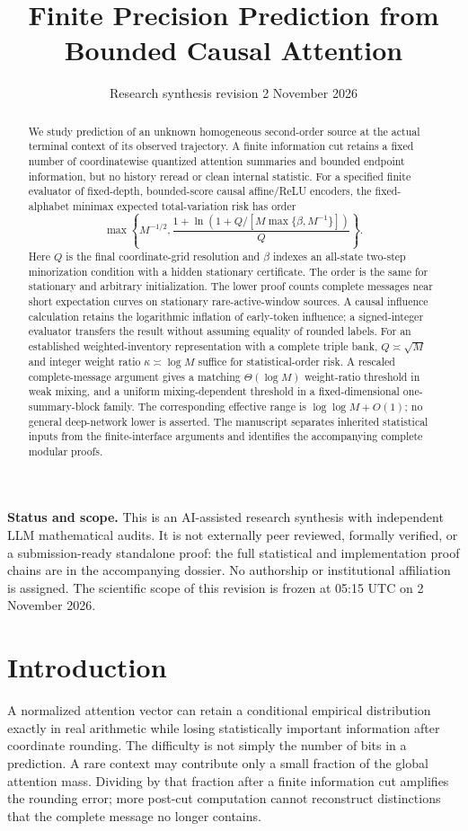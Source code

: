 \documentclass[11pt,letterpaper]{article}
\title{\vspace{-1.4em}Finite Precision Prediction from\\Bounded Causal Attention}
\author{}
\date{Research synthesis revision 2\quad 2 November 2026}
\theoremstyle{definition}\newtheorem{definition}[theorem]{Definition}
\theoremstyle{remark}\newtheorem{remark}[theorem]{Remark}
\begin{document}
\maketitle\vspace{-1.4em}
\begin{abstract}
We study prediction of an unknown homogeneous second-order source at the actual terminal context of its observed trajectory. A finite information cut retains a fixed number of coordinatewise quantized attention summaries and bounded endpoint information, but no history reread or clean internal statistic. For a specified finite evaluator of fixed-depth, bounded-score causal affine/ReLU encoders, the fixed-alphabet minimax expected total-variation risk has order
\[
 \max\left\{M^{-1/2},\frac{1+\ln(1+Q/[M\max\{\beta,M^{-1}\}])}{Q}\right\}.
\]
Here $Q$ is the final coordinate-grid resolution and $\beta$ indexes an all-state two-step minorization condition with a hidden stationary certificate. The order is the same for stationary and arbitrary initialization. The lower proof counts complete messages near short expectation curves on stationary rare-active-window sources. A causal influence calculation retains the logarithmic inflation of early-token influence; a signed-integer evaluator transfers the result without assuming equality of rounded labels. For an established weighted-inventory representation with a complete triple bank, $Q\asymp\sqrt M$ and integer weight ratio $\kappa\asymp\log M$ suffice for statistical-order risk. A rescaled complete-message argument gives a matching $\Theta(\log M)$ weight-ratio threshold in weak mixing, and a uniform mixing-dependent threshold in a fixed-dimensional one-summary-block family. The corresponding effective range is $\log\log M+O(1)$; no general deep-network lower is asserted. The manuscript separates inherited statistical inputs from the finite-interface arguments and identifies the accompanying complete modular proofs.
\end{abstract}
\noindent\textbf{Status and scope.} This is an AI-assisted research synthesis with independent LLM mathematical audits. It is not externally peer reviewed, formally verified, or a submission-ready standalone proof: the full statistical and implementation proof chains are in the accompanying dossier. No authorship or institutional affiliation is assigned. The scientific scope of this revision is frozen at 05:15 UTC on 2 November 2026.

\section{Introduction}
A normalized attention vector can retain a conditional empirical distribution exactly in real arithmetic while losing statistically important information after coordinate rounding. The difficulty is not simply the number of bits in a prediction. A rare context may contribute only a small fraction of the global attention mass. Dividing by that fraction after a finite information cut amplifies the rounding error; more post-cut computation cannot reconstruct distinctions that the complete message no longer contains.
\end{document}
